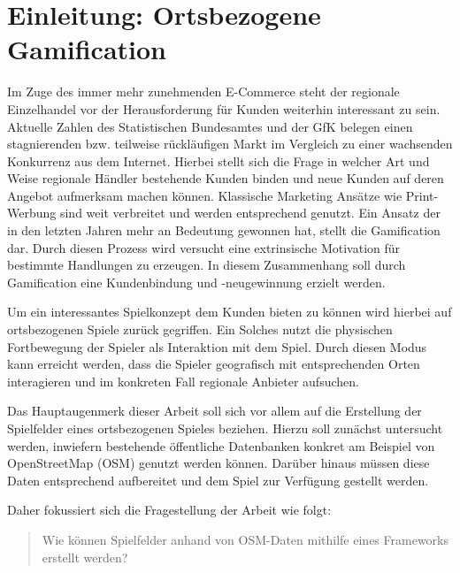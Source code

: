 \chapter{Einleitung: Ortsbezogene Gamification}
\label{ch1:Einleitung}

Im Zuge des immer mehr zunehmenden E-Commerce steht der regionale Einzelhandel vor der Herausforderung für Kunden weiterhin interessant zu sein. Aktuelle Zahlen des Statistischen Bundesamtes \citep{DWN.2012} und der GfK \cite{Gfk.2009} belegen einen stagnierenden bzw. teilweise rückläufigen Markt im Vergleich zu einer wachsenden Konkurrenz aus dem Internet.
Hierbei stellt sich die Frage in welcher Art und Weise regionale Händler bestehende Kunden binden und neue Kunden auf deren Angebot aufmerksam machen können.
Klassische Marketing Ansätze wie Print-Werbung sind weit verbreitet und werden entsprechend genutzt.
Ein Ansatz der in den letzten Jahren mehr an Bedeutung gewonnen hat, stellt die Gamification dar. Durch diesen Prozess wird versucht eine extrinsische Motivation für bestimmte Handlungen zu erzeugen. In diesem Zusammenhang soll durch Gamification eine Kundenbindung und -neugewinnung erzielt werden.

Um ein interessantes Spielkonzept dem Kunden bieten zu können wird hierbei auf ortsbezogenen Spiele zurück gegriffen.
Ein Solches nutzt die physischen Fortbewegung der Spieler als Interaktion mit dem Spiel.
Durch diesen Modus kann erreicht werden, dass die Spieler geografisch mit entsprechenden Orten interagieren und im konkreten Fall regionale Anbieter aufsuchen.

Das Hauptaugenmerk dieser Arbeit soll sich vor allem auf die Erstellung der Spielfelder eines ortsbezogenen Spieles beziehen. Hierzu soll zunächst untersucht werden, inwiefern bestehende öffentliche Datenbanken konkret am Beispiel von OpenStreetMap (OSM) genutzt werden können. Darüber hinaus müssen diese Daten entsprechend aufbereitet und dem Spiel zur Verfügung gestellt werden.

Daher fokussiert sich die Fragestellung der Arbeit wie folgt:
\begin{quote}
\item Wie können Spielfelder anhand von OSM-Daten mithilfe eines Frameworks erstellt werden?
\end{quote}
\vspace{1cm}

